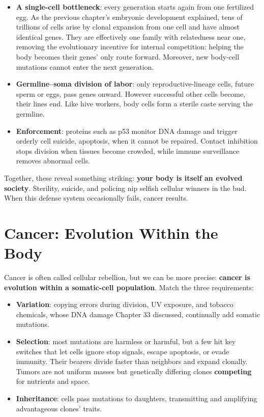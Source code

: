 \begin{itemize}[itemsep=2pt]
\item \textbf{A single-cell bottleneck}: every generation starts again from one fertilized egg. As the previous chapter's embryonic development explained, tens of trillions of cells arise by clonal expansion from one cell and have almost identical genes. They are effectively one family with relatedness near one, removing the evolutionary incentive for internal competition: helping the body becomes their genes' only route forward. Moreover, new body-cell mutations cannot enter the next generation.
\item \textbf{Germline--soma division of labor}: only reproductive-lineage cells, future sperm or eggs, pass genes onward. However successful other cells become, their lines end. Like hive workers, body cells form a sterile caste serving the germline.
\item \textbf{Enforcement}: proteins such as p53 monitor DNA damage and trigger orderly cell suicide, apoptosis, when it cannot be repaired. Contact inhibition stops division when tissues become crowded, while immune surveillance removes abnormal cells.
\end{itemize}

Together, these reveal something striking: \textbf{your body is itself an evolved society}. Sterility, suicide, and policing nip selfish cellular winners in the bud. When this defense system occasionally fails, cancer results.

\section{Cancer: Evolution Within the Body}

Cancer is often called cellular rebellion, but we can be more precise: \textbf{cancer is evolution within a somatic-cell population}. Match the three requirements:

\begin{itemize}[itemsep=2pt]
\item \textbf{Variation}: copying errors during division, UV exposure, and tobacco chemicals, whose DNA damage Chapter 33 discussed, continually add somatic mutations.
\item \textbf{Selection}: most mutations are harmless or harmful, but a few hit key switches that let cells ignore stop signals, escape apoptosis, or evade immunity. Their bearers divide faster than neighbors and expand clonally. Tumors are not uniform masses but genetically differing clones \textbf{competing} for nutrients and space.
\item \textbf{Inheritance}: cells pass mutations to daughters, transmitting and amplifying advantageous clones' traits.
\end{itemize}

